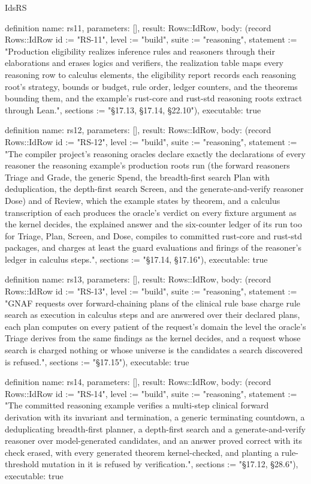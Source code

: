 \begin{lexlean}{IdsRS}
\begin{semanticmodule}
definition{
  name: rs11,
  parameters: [],
  result: Rows::IdRow,
  body: (record Rows::IdRow {id := "RS-11", level := "build", suite := "reasoning", statement := "Production eligibility realizes inference rules and reasoners through their elaborations and erases logics and verifiers, the realization table maps every reasoning row to calculus elements, the eligibility report records each reasoning root's strategy, bounds or budget, rule order, ledger counters, and the theorems bounding them, and the example's rust-core and rust-std reasoning roots extract through Lean.", sections := "§17.13, §17.14, §22.10"}),
  executable: true
}

definition{
  name: rs12,
  parameters: [],
  result: Rows::IdRow,
  body: (record Rows::IdRow {id := "RS-12", level := "build", suite := "reasoning", statement := "The compiler project's reasoning oracles declare exactly the declarations of every reasoner the reasoning example's production roots run (the forward reasoners Triage and Grade, the generic Spend, the breadth-first search Plan with deduplication, the depth-first search Screen, and the generate-and-verify reasoner Dose) and of Review, which the example states by theorem, and a calculus transcription of each produces the oracle's verdict on every fixture argument as the kernel decides, the explained answer and the six-counter ledger of its run too for Triage, Plan, Screen, and Dose, compiles to committed rust-core and rust-std packages, and charges at least the guard evaluations and firings of the reasoner's ledger in calculus steps.", sections := "§17.14, §17.16"}),
  executable: true
}

definition{
  name: rs13,
  parameters: [],
  result: Rows::IdRow,
  body: (record Rows::IdRow {id := "RS-13", level := "build", suite := "reasoning", statement := "GNAF requests over forward-chaining plans of the clinical rule base charge rule search as execution in calculus steps and are answered over their declared plans, each plan computes on every patient of the request's domain the level the oracle's Triage derives from the same findings as the kernel decides, and a request whose search is charged nothing or whose universe is the candidates a search discovered is refused.", sections := "§17.15"}),
  executable: true
}

definition{
  name: rs14,
  parameters: [],
  result: Rows::IdRow,
  body: (record Rows::IdRow {id := "RS-14", level := "build", suite := "reasoning", statement := "The committed reasoning example verifies a multi-step clinical forward derivation with its invariant and termination, a generic terminating countdown, a deduplicating breadth-first planner, a depth-first search and a generate-and-verify reasoner over model-generated candidates, and an answer proved correct with its check erased, with every generated theorem kernel-checked, and planting a rule-threshold mutation in it is refused by verification.", sections := "§17.12, §28.6"}),
  executable: true
}
\end{semanticmodule}
\end{lexlean}
